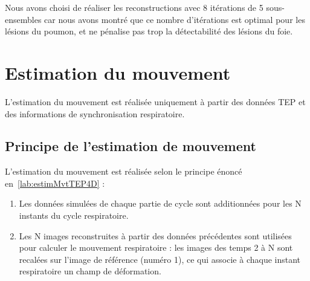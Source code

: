Nous avons choisi de réaliser les reconstructions avec 8 itérations de 5 sous-ensembles car nous avons montré que ce nombre d'itérations est optimal pour les lésions du poumon, et ne pénalise pas trop la détectabilité des lésions du foie.


% 
% 
% 


\section{Estimation du mouvement}

L'estimation du mouvement est réalisée uniquement à partir des données TEP et des informations de synchronisation respiratoire. 

\subsection{Principe de l'estimation de mouvement}

L'estimation du mouvement est réalisée selon le principe énoncé en~\ref{lab:estimMvtTEP4D} :
\begin{enumerate}
 \item Les données simulées de chaque partie de cycle sont additionnées pour les N instants du cycle respiratoire.
 \item Les N images reconstruites à partir des données précédentes sont utilisées pour calculer le mouvement respiratoire : les images des temps 2 à N sont recalées sur l'image de référence (numéro 1), ce qui associe à chaque instant respiratoire un champ de déformation.
\end{enumerate}


